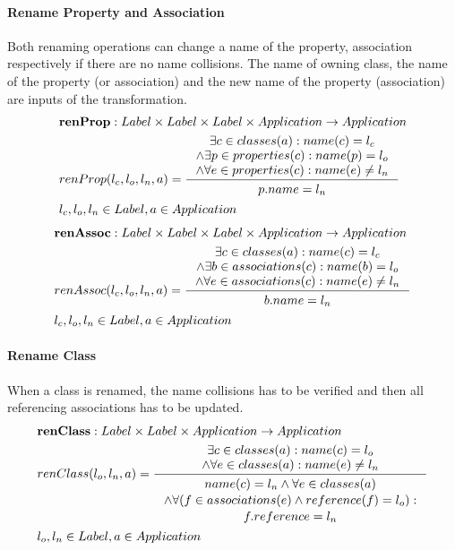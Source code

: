 \documentclass[11pt]{article}
\begin{document}
\paragraph{Rename Property and Association} Both renaming operations can change a name of the property, association respectively if there are no name collisions. The name of owning class, the name of the property (or association) and the new name of the property (association) are inputs of the transformation.
\begin{align*}
&	\mathbf{renProp} : Label \times Label \times Label \times Application \rightarrow Application \\
&	renProp(l_c, l_o, l_n, a) = \inference{\exists c \in classes(a) : name(c) = l_c \\ \wedge \exists p \in properties(c) : name(p) = l_o \\ \wedge \forall e \in properties(c) : name(e) \neq l_n
	}{\begin{gathered}
		p.name = l_n 
	\end{gathered}}\\
&	l_c, l_o, l_n \in Label, a \in Application
\end{align*}
\begin{align*}
&	\mathbf{renAssoc} : Label \times Label \times Label \times Application \rightarrow Application \\
&	renAssoc(l_c, l_o, l_n, a) = \inference{\exists c \in classes(a) : name(c) = l_c \\ \wedge \exists b \in associations(c) : name(b) = l_o \\ \wedge \forall e \in associations(c) : name(e) \neq l_n
	}{\begin{gathered}
		b.name = l_n 
	\end{gathered}}
	\\ & l_c, l_o, l_n \in Label, a \in Application
\end{align*}

\paragraph{Rename Class} When a class is renamed, the name collisions has to be verified and then all referencing associations has to be updated.
\begin{align*}
&	\mathbf{renClass} :  Label \times Label \times Application \rightarrow Application \\
&	renClass(l_o, l_n, a) = \inference{\exists c \in classes(a) : name(c) = l_o \\ \wedge \forall e \in classes(a) : name(e) \neq l_n
	}{\begin{gathered}
		name(c) = l_n \wedge \forall e \in classes(a) \\ \wedge \forall (f \in associations(e) \wedge reference(f) = l_o ) :\\ f.reference = l_n 
	\end{gathered}}\\
& l_o, l_n \in Label, a \in Application	
\end{align*}
\end{document}
